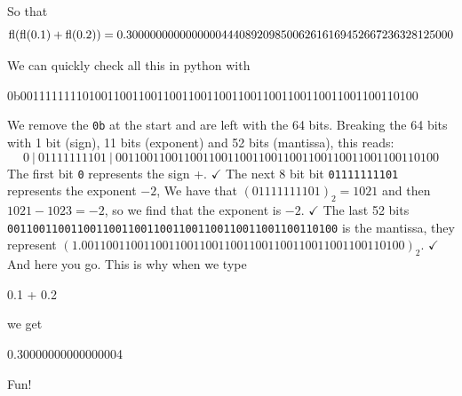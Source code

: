 \documentclass[pdftex,11pt]{article}
\begin{document}
So that 
$$\textmd{fl}( \textmd{fl}(0.1) + \textmd{fl}(0.2) ) = 0.3000000000000000444089209850062616169452667236328125000  $$


We can quickly check all this in python with

\begin{pythonoutput}
0b0011111111010011001100110011001100110011001100110011001100110100
\end{pythonoutput}

We remove the \texttt{0b} at the start and are left with the 64 bits.
Breaking the 64 bits with 1 bit (sign), 11 bits (exponent) and 52 bits (mantissa), this reads:
$$
0~|~01111111101~|~0011001100110011001100110011001100110011001100110100 
$$
The first bit \texttt{0} represents the sign +. $\checkmark$
The next 8 bit bit \texttt{01111111101} represents the exponent $-2$, 
We have that $(01111111101)_2 = 1021$ and then 
$1021-1023 = -2$, so we find that the exponent is $-2$. $\checkmark$
The last 52 bits \texttt{0011001100110011001100110011001100110011001100110100} 
is the mantissa, they represent $(1.0011001100110011001100110011001100110011001100110100)_2$.  $\checkmark$\\

And here you go. This is why when we type
\begin{python}
0.1 + 0.2
\end{python}
we get
\begin{pythonoutput}
0.30000000000000004
\end{pythonoutput}

Fun!
\end{document}
